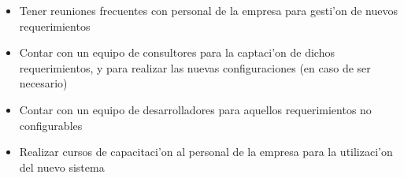 \begin{itemize}
\item Tener reuniones frecuentes con personal de la empresa para gesti'on de nuevos requerimientos
\item Contar con un equipo de consultores para la captaci'on de dichos requerimientos, y para realizar las nuevas configuraciones (en caso de ser necesario)
\item Contar con un equipo de desarrolladores para aquellos requerimientos no configurables
\item Realizar cursos de capacitaci'on al personal de la empresa para la utilizaci'on del nuevo sistema
\end{itemize}